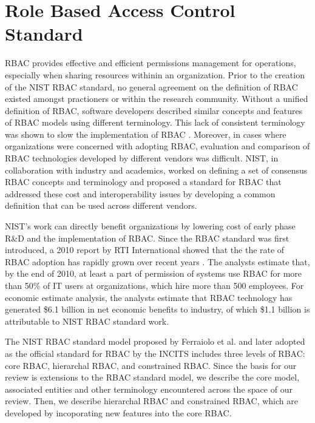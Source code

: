 \section{Role Based Access Control Standard} \label{sec:core-rbac}

RBAC provides effective and efficient permissions management for operations, especially when sharing resources withinin an organization.
Prior to the creation of the NIST RBAC standard, no general agreement on the definition 
of RBAC existed amongst practioners or within the research community. 
Without a unified definition of RBAC, software developers described similar concepts and features of RBAC models using different terminology. 
This lack of consistent terminology was shown to slow the implementation of RBAC \cite{o20102010}.  
Moreover, in cases where organizations were concerned with adopting RBAC,
evaluation and comparison of RBAC technologies developed by different vendors was difficult.
NIST, in collaboration with industry and academics, worked on defining a set of consensus RBAC concepts and terminology and proposed a standard for 
RBAC that addressed these cost and interoperability issues by developing a common definition that can be used across different vendors.

NIST's work can directly benefit organizations by lowering cost of early phase R\&D and the implementation of RBAC.
Since the RBAC standard was first introduced, a 2010 report by RTI International showed that the the rate of RBAC adoption has rapidly grown over recent years \cite{o20102010}. 
The analysts estimate that, by the end of 2010, at least a part of permission of systems use RBAC for more than 50\% of IT users at organizations, which
hire more than 500 employees. For economic estimate analysis, the analysts estimate that RBAC technology has generated \$6.1 billion in net economic benefits to industry, of which \$1.1 billion is attributable to NIST RBAC standard work.

The NIST RBAC standard model proposed by Ferraiolo et al. \cite{ferraiolo} and later adopted as the official standard for RBAC by the INCITS includes three levels of RBAC: core RBAC, hierarchal RBAC, and constrained RBAC.
Since the basis for our review is extensions to the RBAC standard model, we describe the core model, associated entities and other terminology encountered across the space of our review. Then, we describe hierarchal RBAC and constrained RBAC, which are developed by incoporating new features into the core RBAC. 

